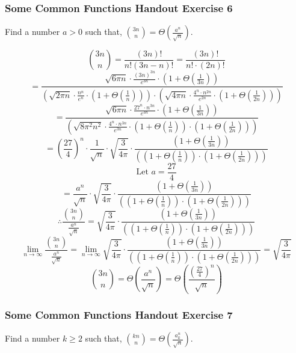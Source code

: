\documentclass{article}
\begin{document}
\subsubsection{Some Common Functions Handout Exercise 6}
Find a number $a > 0$ such that, $\binom{3n}{n} = \Theta(\frac{a^n}{\sqrt{n}})$.

$$\binom{3n}{n} = \frac{(3n)!}{n!(3n-n)!} = \frac{(3n)!}{n! \cdot (2n)!}$$
$$= \frac{\sqrt{6\pi n} \cdot \frac{(3n)^{3n}}{e^{3n}} \cdot (1 + \Theta(\frac{1}{3n})) }{(\sqrt{2\pi n} \cdot \frac{n^n}{e^n} \cdot (1 + \Theta(\frac{1}{n})) ) \cdot (\sqrt{4 \pi n} \cdot \frac{4^n \cdot n^{2n}}{e^{2n}} \cdot (1 + \Theta(\frac{1}{2n})))  }$$
$$= \frac{\sqrt{6\pi n} \cdot \frac{27^n \cdot n^{3n}}{e^{3n}} \cdot (1 + \Theta(\frac{1}{3n})) }{(\sqrt{8\pi^2 n^2} \cdot \frac{4^n \cdot n^{3n}}{e^{3n}} \cdot (1 + \Theta(\frac{1}{n})) \cdot (1 + \Theta(\frac{1}{2n})))}$$
$$= (\frac{27}{4})^n \cdot \frac{1}{\sqrt{n}} \cdot \sqrt{\frac{3}{4\pi}} \cdot \frac{(1 + \Theta(\frac{1}{3n})) }{((1 + \Theta(\frac{1}{n})) \cdot (1 + \Theta(\frac{1}{2n})))}$$
$$\text{Let } a = \frac{27}{4}$$
$$= \frac{a^n}{\sqrt{n}} \cdot \sqrt{\frac{3}{4\pi}} \cdot \frac{(1 + \Theta(\frac{1}{3n})) }{((1 + \Theta(\frac{1}{n})) \cdot (1 + \Theta(\frac{1}{2n})))}$$
$$\therefore \frac{\binom{3n}{n}}{\frac{a^n}{\sqrt{n}}} = \sqrt{\frac{3}{4\pi}} \cdot \frac{(1 + \Theta(\frac{1}{3n})) }{((1 + \Theta(\frac{1}{n})) \cdot (1 + \Theta(\frac{1}{2n})))}$$
$$\lim_{n \rightarrow \infty} \frac{\binom{3n}{n}}{\frac{a^n}{\sqrt{n}}} = \lim_{n \rightarrow \infty} \sqrt{\frac{3}{4\pi}} \cdot \frac{(1 + \Theta(\frac{1}{3n})) }{((1 + \Theta(\frac{1}{n})) \cdot (1 + \Theta(\frac{1}{2n})))} = \sqrt{\frac{3}{4\pi}}$$
$$\binom{3n}{n} = \Theta(\frac{a^n}{\sqrt{n}}) = \Theta(\frac{(\frac{27}{4})^n}{\sqrt{n}})$$

\subsubsection{Some Common Functions Handout Exercise 7}
Find a number $k \ge 2$ such that, $\binom{kn}{n} = \Theta(\frac{a_{k}^{n}}{\sqrt{n}})$.
\end{document}
